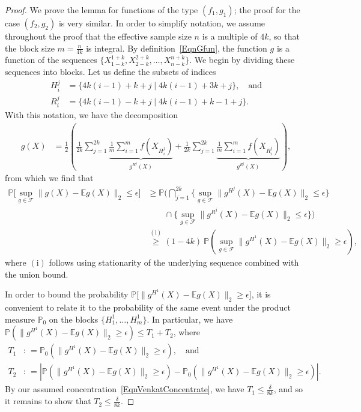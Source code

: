 \documentclass[twoside,11pt]{article}
\newcommand{\numobs}{\ensuremath{n}}
\def\EE{ \mathbb{E} }
\newcommand{\subsize}{\numobs} %
\newcommand{\blocksize}{\ensuremath{m}}
\newcommand{\oddblockindeces}[2]{H^{#1}_{#2}}
\newcommand{\evenblockindeces}[2]{R^{#1}_{#2}}
\newcommand{\mprob}{\ensuremath{\mathbb{P}}}
\newcommand{\defn}{: \, = }
\newcommand{\kdim}{\ensuremath{k}}
\begin{document}
%
\begin{proof}
We prove the lemma for functions of the type $(f_1, g_1)$; the proof
for the case $(f_2, g_2)$ is very similar.  In order to simplify
notation, we assume throughout the proof that the effective sample
size $\subsize$ is a multiple of $4\kdim $, so that the block size
$\blocksize = \frac{\subsize}{4 \kdim}$ is integral.  By
definition~\eqref{EqnGfun}, the function $g$ is a function of the
sequences $\{X_{1-k}^{1+k},
X_{2-k}^{2+k},\ldots,X_{\subsize-k}^{\subsize+k}\}$.  We begin by
dividing these sequences into blocks.  Let us define the subsets of
indices
\begin{align*}
\oddblockindeces{j}{i} &= \{ 4k(i-1)+k+j \mid 4k(i-1) +3k +j\}, \quad
\mbox{and} \\
%
 \evenblockindeces{j}{i} &= \{4k(i-1) -k+j \mid
4k(i-1) +k - 1 +j\}.
\end{align*}
With this notation, we have the decomposition
\begin{align*}
g(X) & = \frac{1}{2} \left(\frac{1}{2k}\sum_{j=1}^{2k}
\underbrace{\frac{1}{\blocksize} \sum_{i=1}^\blocksize
  f(X_{H_i^j})}_{g^{H^j}(X)} + \frac{1}{2k} \sum_{j=1}^{2k}
\underbrace{\frac{1}{\blocksize} \sum_{i=1}^\blocksize
  f(X_{R_i^j})}_{g^{R^j}(X)} \right),
\end{align*}
from which we find that
\begin{align*}
\mprob \big[ \sup_{g\in \mathcal{F}} \| g(X) - \EE g(X)\|_2 \leq \epsilon \big] & \geq \mprob
\big( \bigcap_{j=1}^{2k} \{\sup_{g\in\mathcal{F}}\| g^{H^j}(X)- \EE g(X) \|_2 \leq
\epsilon\}\\
&\qquad \cap \{ \sup_{g\in\mathcal{F}}\| g^{R^j}(X) - \EE g(X)\|_2 \leq \epsilon\} \big)\\
% 
&\stackrel{\mathrm{(i)}}{\geq} (1 - 4 \kdim) \: \mprob(
\sup_{g\in\mathcal{F}}\| g^{H^1}(X) - \EE g(X)\|_2 \geq \epsilon),
\end{align*}
where $\mathrm{(i)}$ follows using stationarity of the underlying
sequence combined with the union bound.


In order to bound the probability $\mprob \big[ \| g^{H^1}(X) - \EE
  g(X)\|_2 \geq \epsilon\big]$, it is convenient to relate it to the
probability of the same event under the product measure $\mprob_0$ on
the blocks $\{H^1_1,\ldots, H^1_{\blocksize}\}.$ In particular, we
have $\mprob(\| g^{H^1}(X) - \EE g(X)\|_2 \geq \epsilon) \leq T_1 +
T_2$, where
\begin{align*}
T_1 & \defn \mprob_0(\| g^{H^1}(X) - \EE g(X)\|_2 \geq \epsilon),
\quad \mbox{and} \\
%
T_2 &\defn |\mprob(\| g^{H^1}(X) - \EE g(X)\|_2 \geq \epsilon) -
\mprob_0(\| g^{H^1}(X) - \EE g(X)\|_2 \geq \epsilon)|.
\end{align*}
By our assumed concentration~\eqref{EqnVenkatConcentrate}, we have
$T_1 \leq \frac{\delta}{8k}$, and so it remains to show that $T_2
\leq \frac{\delta}{8k}$.


\end{proof}
\end{document}
